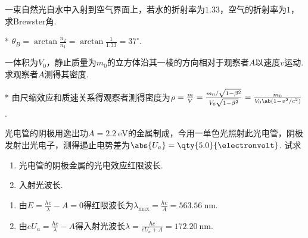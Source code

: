 \begin{problem}[起偏角][5]
    一束自然光自水中入射到空气界面上，若水的折射率为$1.33$，空气的折射率为$1$，求Brewster角.
\end{problem}
\begin{solution}*
    $\theta_B=\arctan{\frac{n_2}{n_1}}=\arctan{\frac{1}{1.33}}=37^{\circ}$. 
\end{solution}

\begin{problem}
    一体积为$V_0$，静止质量为$m_0$的立方体沿其一棱的方向相对于观察者$A$以速度$v$运动. 求观察者$A$测得其密度.
\end{problem}
\begin{solution}*
    由尺缩效应和质速关系得观察者测得密度为$\rho=\frac{m}{V}=\frac{m_0/\sqrt{1-\beta^2}}{V_0\sqrt{1-\beta^2}}=\frac{m_0}{V_0\ab(1-v^2/c^2)}$. 
\end{solution}

\begin{problem}[光电效应][8]
    光电管的阴极用逸出功$A=\qty{2.2}{\electronvolt}$的金属制成，今用一单色光照射此光电管，阴极发射出光电子，测得遏止电势差为$\abs{U_a}=\qty{5.0}{\electronvolt}$. 试求
\begin{enumerate}
    \item 光电管的阴极金属的光电效应红限波长.
    \item 入射光波长.
\end{enumerate}
\end{problem}
\begin{solution}
\begin{enumerate}
    \item 由$E=\frac{hc}{\lambda}-A=0$得红限波长为$\lambda_{\max}=\frac{hc}{A}=\qty{563.56}{\nm}$. 
    \item 由$eU_a=\frac{hc}{\lambda}-A$得入射光波长$\lambda=\frac{hc}{eU_a+A}=\qty{172.20}{\nm}$. 
\end{enumerate}
\end{solution}


\vfill
{}